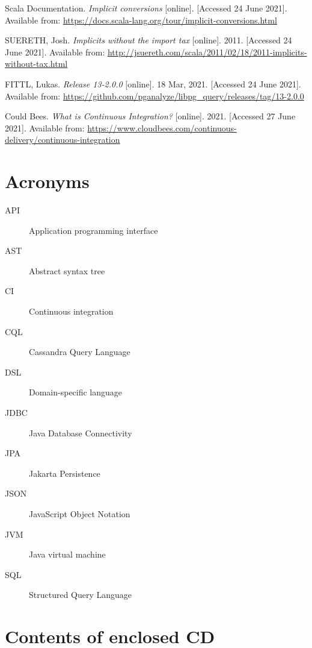 \documentclass[thesis=B,english]{FITthesis}[2019/12/23]
\begin{document}
\begin{thebibliography}{9}
Scala Documentation.
\textit {Implicit conversions} [online]. [Accessed 24 June 2021]. Available from:
\url{https://docs.scala-lang.org/tour/implicit-conversions.html}

SUERETH, Josh.
\textit {Implicits without the import tax} [online]. 2011. [Accessed 24 June 2021]. Available from: \url{http://jsuereth.com/scala/2011/02/18/2011-implicits-without-tax.html}

FITTL, Lukas.
\textit {Release 13-2.0.0} [online]. 18 Mar, 2021. [Accessed 24 June 2021]. Available from:
\url{https://github.com/pganalyze/libpg\_query/releases/tag/13-2.0.0}

Could Bees.
\textit{What is Continuous Integration?}  [online]. 2021. [Accessed 27 June 2021]. Available from: \url{https://www.cloudbees.com/continuous-delivery/continuous-integration}

\end{thebibliography}
\appendix

\chapter{Acronyms}
\begin{description}
	\item[API] Application programming interface
	\item[AST] Abstract syntax tree
	\item[CI] Continuous integration
	\item[CQL] Cassandra Query Language
	\item[DSL] Domain-specific language
	\item[JDBC] Java Database Connectivity
	\item[JPA] Jakarta Persistence
	\item[JSON] JavaScript Object Notation
	\item[JVM] Java virtual machine
	\item[SQL] Structured Query Language
\end{description}


\chapter{Contents of enclosed CD}


\begin{figure}
\end{figure}
\end{document}
